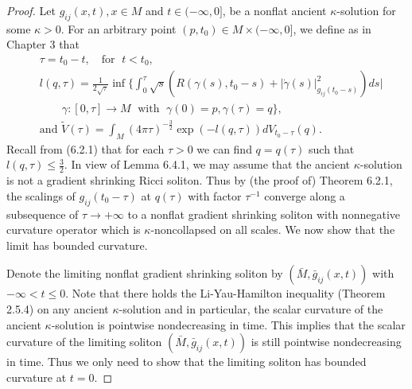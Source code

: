 \begin{proof}
Let $g_{ij}(x,t), x\in M$ and $t\in(-\infty, 0]$, be a nonflat
ancient $\kappa$-solution for some $\kappa>0$. For an arbitrary
point $(p,t_0)\in M\times (-\infty,0]$, we define as in Chapter 3
that
\begin{align*}
& \tau=t_0-t,\quad \mbox{for }\;t<t_0,\\
& l(q,\tau)=\frac{1}{2\sqrt{\tau}}
\inf\bigg\{\int_0^\tau\sqrt{s}(R(\gamma(s),t_0-s)
+|\dot{\gamma}(s)|^2_{g_{ij}(t_0-s)})ds|\\
& \qquad \gamma:[0,\tau]\rightarrow M\;\mbox{ with }
\;\gamma(0)=p,\gamma(\tau)=q\bigg\},\\
&  \mbox{and }\widetilde{V}(\tau)
=\int_M(4\pi\tau)^{-\frac{3}{2}}\exp(-l(q,\tau))dV_{t_0-\tau}(q).
\end{align*}
Recall from (6.2.1) that for each $\tau>0$ we can find $q=q(\tau)$
such that $l(q,\tau)\le\frac{3}{2}$. In view of Lemma 6.4.1, we
may assume that the ancient $\kappa$-solution is not a gradient
shrinking Ricci soliton. Thus by (the proof of) Theorem 6.2.1, the
scalings of $g_{ij}(t_0-\tau)$ at $q(\tau)$ with factor
$\tau^{-1}$ converge along a subsequence of
$\tau\rightarrow+\infty$ to a nonflat gradient shrinking soliton
with nonnegative curvature operator which is $\kappa$-noncollapsed
on all scales. We now show that the limit has bounded curvature.

Denote the limiting nonflat gradient shrinking soliton by
$(\bar{M},\bar{g}_{ij}(x,t))$ with $-\infty < t \leq 0$. Note that
there holds the Li-Yau-Hamilton inequality (Theorem 2.5.4) on any
ancient $\kappa$-solution and in particular, the scalar curvature
of the ancient $\kappa$-solution is pointwise nondecreasing in
time. This implies that the scalar curvature of the limiting
soliton $(\bar{M},\bar{g}_{ij}(x,t))$ is still pointwise
nondecreasing in time. Thus we only need to show that the limiting
soliton has bounded curvature at $t=0$.


\end{proof}
